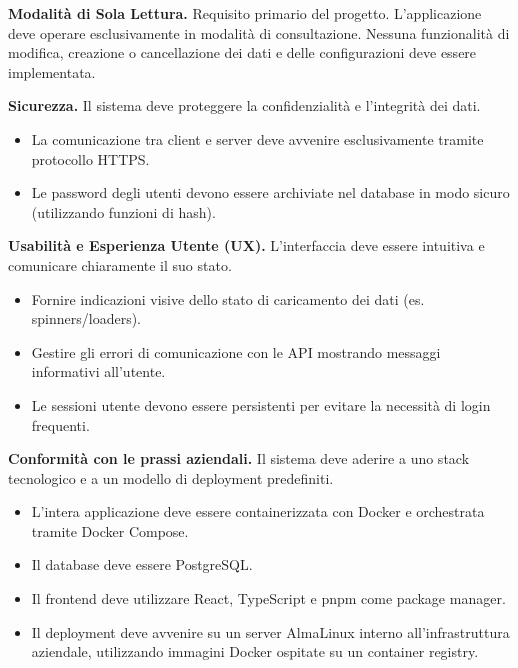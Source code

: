 \documentclass[12pt,a4paper,openright,twoside]{book}
\begin{document}
\begin{reqnonfunz}
    \item \label{req:readonly} \textbf{Modalità di Sola Lettura.} Requisito primario del progetto. L'applicazione deve operare esclusivamente in modalità di consultazione. Nessuna funzionalità di modifica, creazione o cancellazione dei dati e delle configurazioni deve essere implementata.

    \item \label{req:security} \textbf{Sicurezza.} Il sistema deve proteggere la confidenzialità e l'integrità dei dati.
          \begin{itemize}
              \item La comunicazione tra client e server deve avvenire esclusivamente tramite protocollo HTTPS.
              \item Le password degli utenti devono essere archiviate nel database in modo sicuro (utilizzando funzioni di hash).
          \end{itemize}

    \item \label{req:ux} \textbf{Usabilità e Esperienza Utente (UX).} L'interfaccia deve essere intuitiva e comunicare chiaramente il suo stato.
          \begin{itemize}
              \item Fornire indicazioni visive dello stato di caricamento dei dati (es. spinners/loaders).
              \item Gestire gli errori di comunicazione con le API mostrando messaggi informativi all'utente.
              \item Le sessioni utente devono essere persistenti per evitare la necessità di login frequenti.
          \end{itemize}


    \item \label{req:comformity} \textbf{Conformità con le prassi aziendali.} Il sistema deve aderire a uno stack tecnologico e a un modello di deployment predefiniti.
          \begin{itemize}
              \item L'intera applicazione deve essere containerizzata con Docker e orchestrata tramite Docker Compose.
              \item Il database deve essere PostgreSQL.
              \item Il frontend deve utilizzare React, TypeScript e pnpm come package manager.
              \item Il deployment deve avvenire su un server AlmaLinux interno all'infrastruttura aziendale, utilizzando immagini Docker ospitate su un container registry.
          \end{itemize}

\end{reqnonfunz}
\end{document}
